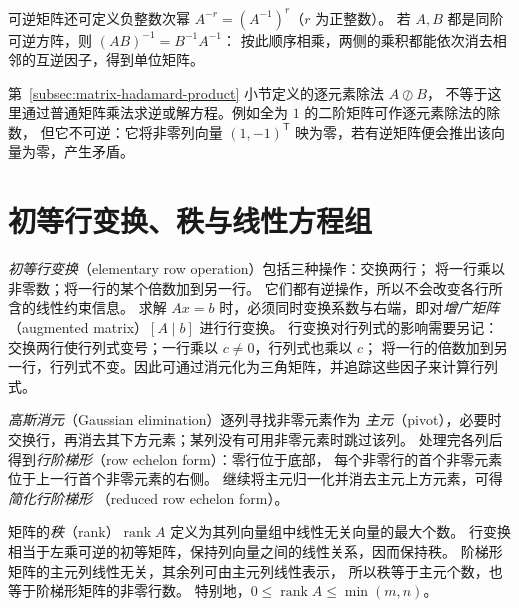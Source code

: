 \documentclass[UTF8,12pt,a4paper,fontset=fandol]{ctexart}
\begin{document}
可逆矩阵还可定义负整数次幂 $A^{-r}=(A^{-1})^r$（$r$ 为正整数）。
若 $A,B$ 都是同阶可逆方阵，则 $(AB)^{-1}=B^{-1}A^{-1}$：
按此顺序相乘，两侧的乘积都能依次消去相邻的互逆因子，得到单位矩阵。

第~\ref{subsec:matrix-hadamard-product} 小节定义的逐元素除法 $A\oslash B$，
不等于这里通过普通矩阵乘法求逆或解方程。例如全为 $1$ 的二阶矩阵可作逐元素除法的除数，
但它不可逆：它将非零列向量 $(1,-1)^{\mathsf T}$ 映为零，若有逆矩阵便会推出该向量为零，产生矛盾。

\section{初等行变换、秩与线性方程组}
\label{sec:matrix-elimination-rank}

\emph{初等行变换}（elementary row operation）包括三种操作：交换两行；
将一行乘以非零数；将一行的某个倍数加到另一行。
它们都有逆操作，所以不会改变各行所含的线性约束信息。
求解 $Ax=b$ 时，必须同时变换系数与右端，即对\emph{增广矩阵}
（augmented matrix）$[A\mid b]$ 进行行变换。
行变换对行列式的影响需要另记：交换两行使行列式变号；一行乘以 $c\ne0$，行列式也乘以 $c$；
将一行的倍数加到另一行，行列式不变。因此可通过消元化为三角矩阵，并追踪这些因子来计算行列式。

\emph{高斯消元}（Gaussian elimination）逐列寻找非零元素作为
\emph{主元}（pivot），必要时交换行，再消去其下方元素；某列没有可用非零元素时跳过该列。
处理完各列后得到\emph{行阶梯形}（row echelon form）：零行位于底部，
每个非零行的首个非零元素位于上一行首个非零元素的右侧。
继续将主元归一化并消去主元上方元素，可得\emph{简化行阶梯形}
（reduced row echelon form）。

矩阵的\emph{秩}（rank）$\operatorname{rank}A$ 定义为其列向量组中线性无关向量的最大个数。
行变换相当于左乘可逆的初等矩阵，保持列向量之间的线性关系，因而保持秩。
阶梯形矩阵的主元列线性无关，其余列可由主元列线性表示，
所以秩等于主元个数，也等于阶梯形矩阵的非零行数。
特别地，$0\le\operatorname{rank}A\le\min(m,n)$。
\end{document}
